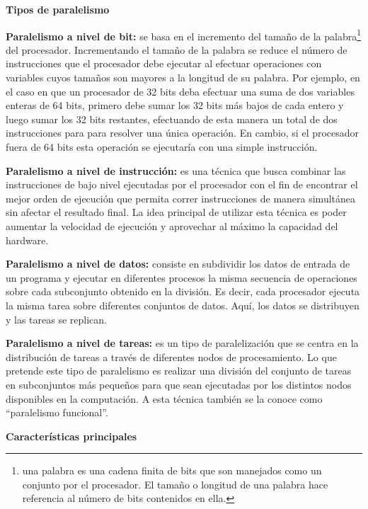 \textbf{\newline \large Tipos de paralelismo}

\textbf{\newline Paralelismo a nivel de bit:} se basa en el incremento del tamaño de la palabra\footnote{una palabra es una cadena finita de bits que son manejados como un conjunto por el procesador. El tamaño o longitud de una palabra hace referencia al número de bits contenidos en ella.} del procesador. 
 Incrementando el tamaño de la palabra se reduce el número de instrucciones que el procesador debe ejecutar al efectuar operaciones con variables cuyos tamaños son mayores a la longitud de su palabra. Por ejemplo, en el caso en que un procesador de 32 bits deba efectuar una suma de dos variables enteras de 64 bits, primero debe sumar los 32 bits más bajos de cada entero y luego sumar los 32 bits restantes, efectuando de esta manera un total de dos instrucciones para para resolver una única operación. En cambio, 
 si el procesador fuera de 64 bits esta operación se ejecutaría con una simple instrucción.

\textbf{\newline Paralelismo a nivel de instrucción:} es una técnica que busca combinar las instrucciones de bajo nivel ejecutadas por el procesador con el fin de encontrar el mejor orden de ejecución que permita correr instrucciones de manera simultánea sin afectar el resultado final. La idea principal de utilizar esta técnica es poder aumentar la velocidad de ejecución y aprovechar al máximo la capacidad del hardware.
 
\textbf{\newline Paralelismo a nivel de datos:} consiste en subdividir los datos de entrada de un programa y ejecutar en diferentes procesos la misma secuencia de operaciones sobre cada subconjunto obtenido en la división. Es decir, cada procesador ejecuta la misma tarea sobre diferentes conjuntos de datos. Aquí, los datos se distribuyen y las tareas se replican.

\textbf{\newline Paralelismo a nivel de tareas:} es un tipo de paralelización que se centra en la distribución de tareas a través de diferentes nodos de procesamiento. Lo que pretende este tipo de paralelismo es realizar una división del conjunto de tareas en subconjuntos más pequeños para que sean
 ejecutadas por los distintos nodos disponibles en la computación.
 A esta técnica también se la conoce como ``paralelismo funcional''.

\textbf{\newline \large Características principales}

